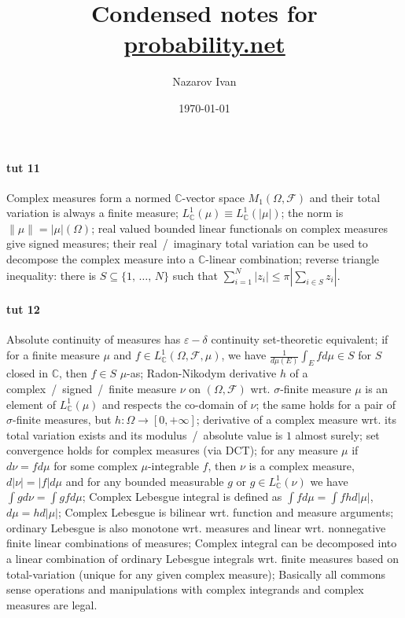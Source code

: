 \documentclass[a4paper]{article}
\title{Condensed notes for \url{probability.net}}
\author{Nazarov Ivan}
\date{\today}
\newcommand{\Fcal}{\mathcal{F}}
\newcommand{\cplx}{\mathbb{C}}
\begin{document}
\maketitle


\paragraph{tut 11} %
\label{par:tut_11}

Complex measures form a normed $\cplx$-vector space $M_1(\Omega, \Fcal)$ and their total variation is always a finite measure;
$L^1_\cplx(\mu) \equiv L^1_\cplx(|\mu|)$;
the norm is $\|\mu\| = |\mu|(\Omega)$;
real valued bounded linear functionals on complex measures give signed measures;
their real~/~imaginary total variation can be used to decompose the complex measure into a $\cplx$-linear combination;
reverse triangle inequality: there is $S \subseteq \{1,\, \ldots,\,N\}$ such that $\sum_{i=1}^N |z_i| \leq \pi |\sum_{i \in S} z_i|$.



\paragraph{tut 12} %
\label{par:tut_12}

Absolute continuity of measures has $\varepsilon - \delta$ continuity set-theoretic equivalent;
if for a finite measure $\mu$ and $f \in L^1_\cplx(\Omega, \Fcal, \mu)$, we have $\tfrac1{d\mu(E)} \int_E f d\mu \in S$ for $S$ closed in $\cplx$, then $f \in S$ $\mu$-as;
Radon-Nikodym derivative $h$ of a complex~/~signed~/~finite measure $\nu$ on $(\Omega, \Fcal)$ wrt. $\sigma$-finite measure $\mu$ is an element of $L^1_\cplx(\mu)$ and respects the co-domain of $\nu$;
the same holds for a pair of $\sigma$-finite measures, but $h\colon \Omega \to [0, +\infty]$;
derivative of a complex measure wrt. its total variation exists and its modulus~/~absolute value is $1$ almost surely;
set convergence holds for complex measures (via DCT);
for any measure $\mu$ if $d\nu = f d\mu$ for some complex $\mu$-integrable $f$, then $\nu$ is a complex measure, $d|\nu| = |f| d\mu$ and for any bounded measurable $g$ or $g \in L^1_\cplx(\nu)$ we have $\int g d\nu = \int g f d\mu$;
Complex Lebesgue integral is defined as $\int f d\mu = \int f h d|\mu|$, $d\mu = h d|\mu|$;
Complex Lebesgue is bilinear wrt. function and measure arguments;
ordinary Lebesgue is also monotone wrt. measures and linear wrt. nonnegative finite linear combinations of measures;
Complex integral can be decomposed into a linear combination of ordinary Lebesgue integrals wrt. finite measures based on total-variation (unique for any given complex measure);
Basically all commons sense operations and manipulations with complex integrands and complex measures are legal.
\end{document}
